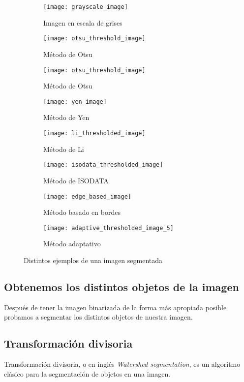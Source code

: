 \begin{figure}
	\centering
	\begin{subfigure}[b]{0.45\textwidth}
        \texttt{[image: grayscale\_image]}
        \caption{Imagen en escala de grises}
    \end{subfigure}
    \begin{subfigure}[b]{0.45\textwidth}
        \texttt{[image: otsu\_threshold\_image]}
        \caption{Método de Otsu}
    \end{subfigure}
    \begin{subfigure}[b]{0.45\textwidth}
        \texttt{[image: otsu\_threshold\_image]}
        \caption{Método de Otsu}
    \end{subfigure}
    \begin{subfigure}[b]{0.45\textwidth}
        \texttt{[image: yen\_image]}
        \caption{Método de Yen}
    \end{subfigure}
    \begin{subfigure}[b]{0.45\textwidth}
        \texttt{[image: li\_thresholded\_image]}
        \caption{Método de Li}
    \end{subfigure}
    \begin{subfigure}[b]{0.45\textwidth}
        \texttt{[image: isodata\_thresholded\_image]}
        \caption{Método de ISODATA}    
    \end{subfigure}
    \begin{subfigure}[b]{0.45\textwidth}
        \texttt{[image: edge\_based\_image]}
        \caption{Método basado en bordes}    
    \end{subfigure}
    \begin{subfigure}[b]{0.45\textwidth}
        \texttt{[image: adaptive\_thresholded\_image\_5]}
        \caption{Método adaptativo}    
    \end{subfigure}
    \caption{Distintos ejemplos de una imagen segmentada}
	\label{fig:5.1.2}
\end{figure} 

\subsection{Obtenemos los distintos objetos de la imagen}
Después de tener la imagen binarizada de la forma más apropiada posible probamos a segmentar los distintos objetos de nuestra imagen.

\subsection{Transformación divisoria}
Transformación divisoria, o en inglés \textit{Watershed segmentation}, es un algoritmo clásico para la segmentación de objetos en una imagen.

